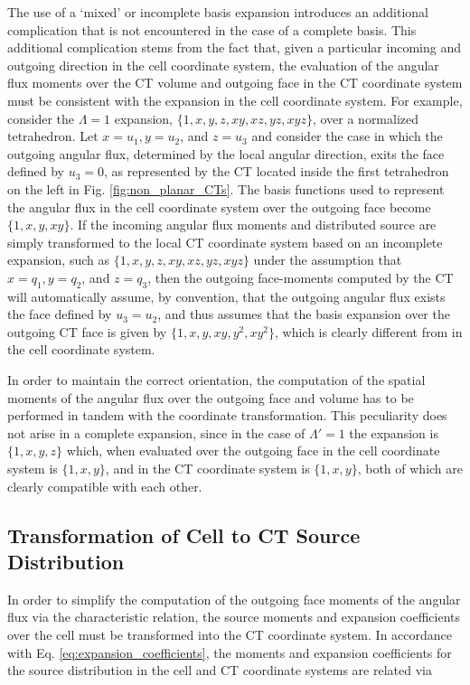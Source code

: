 The use of a ‘mixed’ or incomplete basis expansion introduces an additional complication that is not encountered in the case of a complete basis.
This additional complication stems from the fact that, given a particular incoming and outgoing direction in the cell coordinate system, the evaluation of the angular flux moments over the CT volume and outgoing face in the CT coordinate system must be consistent with the expansion in the cell coordinate system.
For example, consider the $\Lambda = 1$ expansion, $\{1, x, y, z, xy, xz, yz, xyz \}$, over a normalized tetrahedron.
Let $x = u_1, y = u_2$, and $z = u_3$ and consider the case in which the outgoing angular flux, determined by the local angular direction, exits the face defined by $u_3 = 0$, as represented by the CT located inside the first tetrahedron on the left in Fig. \ref{fig:non_planar_CTs}.
The basis functions used to represent the angular flux in the cell coordinate system over the outgoing face become $\{ 1, x, y, xy \}$.
If the incoming angular flux moments and distributed source are simply transformed to the local CT coordinate system based on an incomplete expansion, such as $\{ 1, x, y, z, xy, xz, yz, xyz \}$ under the assumption that $x = q_1, y = q_2$, and $z = q_3$, then the outgoing face-moments computed by the CT will automatically assume, by convention, that the outgoing angular flux exists the face defined by $u_3 = u_2$, and thus assumes that the basis expansion over the outgoing CT face is given by $\{ 1, x, y, xy, y^2, xy^2 \}$, which is clearly different from in the cell coordinate system.

In order to maintain the correct orientation, the computation of the spatial moments of the angular flux over the outgoing face and volume has to be  performed in tandem with the coordinate transformation.
This peculiarity does not arise in a complete expansion, since in the case of $\Lambda ' = 1$ the expansion is $\{ 1, x, y, z \}$ which, when evaluated over the outgoing face in the cell coordinate system is $\{ 1, x, y \}$, and in the CT coordinate system is $\{ 1, x, y \}$, both of which are clearly compatible with each other.

\subsection{Transformation of Cell to CT Source Distribution}

In order to simplify the computation of the outgoing face moments of the angular flux via the characteristic relation, the source moments and expansion coefficients over the cell must be transformed into the CT coordinate system.
In accordance with Eq. \ref{eq:expansion_coefficients}, the moments and expansion coefficients for the source distribution in the cell and CT coordinate systems are related via

